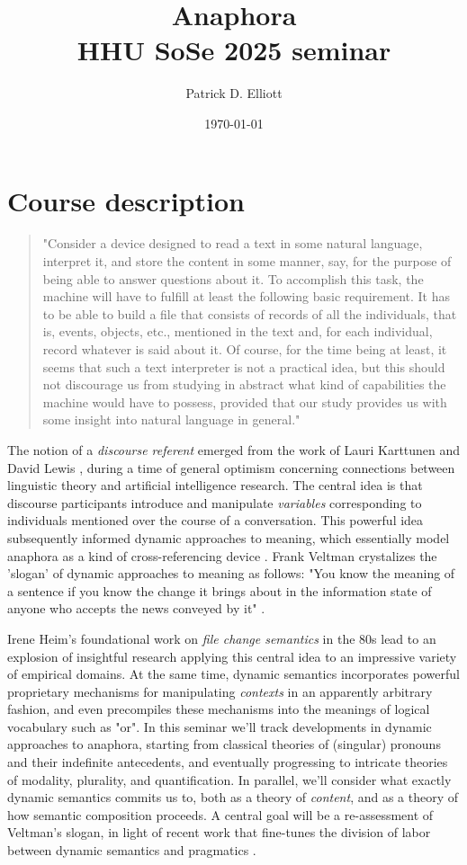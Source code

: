 \documentclass[a4paper]{scrartcl}
\author{Patrick D. Elliott}
\date{\today}
\title{Anaphora\\\medskip
\large HHU SoSe 2025 seminar}
\begin{document}
\maketitle
\section{Course description}
\label{sec:org8994dbc}

\begin{quote}
"Consider a device designed to read a text in some natural language,
interpret it, and store the content in some manner, say, for the purpose
of being able to answer questions about it. To accomplish this task,
the machine will have to fulfill at least the following basic requirement.
It has to be able to build a file that consists of records of all the
individuals, that is, events, objects, etc., mentioned in the text and, for
each individual, record whatever is said about it. Of course, for the time being at least, it seems that such a text interpreter is not a practical idea, but this should not discourage us from studying in abstract what kind of capabilities the machine would have to possess, provided that our study
provides us with some insight into natural language in general." \autocite{Karttunen1976} 
\end{quote}

The notion of a \emph{discourse referent} emerged from the work of Lauri Karttunen and David Lewis \autocite{Karttunen1976,Lewis1979a} , during a time of general optimism concerning connections between linguistic theory and artificial intelligence research. The central idea is that discourse participants introduce and manipulate \emph{variables} corresponding to individuals mentioned over the course of a conversation. This powerful idea subsequently informed dynamic approaches to meaning, which essentially model anaphora as a kind of cross-referencing device \autocite{Heim1982,GroenendijkStokhof1991} . Frank Veltman crystalizes the 'slogan' of dynamic approaches to meaning as follows: "You know the meaning of a sentence if you know the change it brings about in the information state of anyone who accepts the news conveyed by it" \autocite{Veltman1996a}.

Irene Heim's foundational work on \emph{file change semantics} in the 80s lead to an explosion of insightful research applying this central idea to an impressive variety of empirical domains. At the same time, dynamic semantics incorporates powerful proprietary mechanisms for manipulating \emph{contexts} in an apparently arbitrary fashion, and even precompiles these mechanisms into the meanings of logical vocabulary such as "or". In this seminar we'll track developments in dynamic approaches to anaphora, starting from classical theories of (singular) pronouns and their indefinite antecedents, and eventually progressing to intricate theories of modality, plurality, and quantification. In parallel, we'll consider what exactly dynamic semantics commits us to, both as a theory of \emph{content}, and as a theory of how semantic composition proceeds. A central goal will be a re-assessment of Veltman's slogan, in light of recent work that fine-tunes the division of labor between dynamic semantics and pragmatics \autocite{Mandelkern2022a,Elliott2020f}.  
\end{document}
